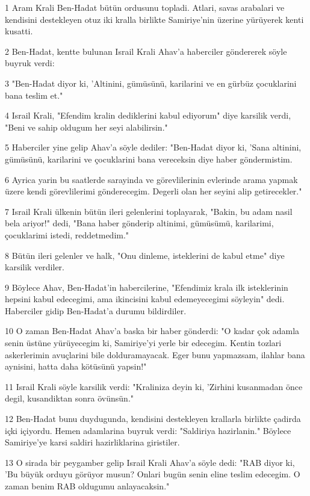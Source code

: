 \par 1 Aram Krali Ben-Hadat bütün ordusunu topladi. Atlari, savas arabalari ve kendisini destekleyen otuz iki kralla birlikte Samiriye'nin üzerine yürüyerek kenti kusatti.
\par 2 Ben-Hadat, kentte bulunan Israil Krali Ahav'a haberciler göndererek söyle buyruk verdi:
\par 3 "Ben-Hadat diyor ki, 'Altinini, gümüsünü, karilarini ve en gürbüz çocuklarini bana teslim et."
\par 4 Israil Krali, "Efendim kralin dediklerini kabul ediyorum" diye karsilik verdi, "Beni ve sahip oldugum her seyi alabilirsin."
\par 5 Haberciler yine gelip Ahav'a söyle dediler: "Ben-Hadat diyor ki, 'Sana altinini, gümüsünü, karilarini ve çocuklarini bana vereceksin diye haber göndermistim.
\par 6 Ayrica yarin bu saatlerde sarayinda ve görevlilerinin evlerinde arama yapmak üzere kendi görevlilerimi gönderecegim. Degerli olan her seyini alip getirecekler."
\par 7 Israil Krali ülkenin bütün ileri gelenlerini toplayarak, "Bakin, bu adam nasil bela ariyor!" dedi, "Bana haber gönderip altinimi, gümüsümü, karilarimi, çocuklarimi istedi, reddetmedim."
\par 8 Bütün ileri gelenler ve halk, "Onu dinleme, isteklerini de kabul etme" diye karsilik verdiler.
\par 9 Böylece Ahav, Ben-Hadat'in habercilerine, "Efendimiz krala ilk isteklerinin hepsini kabul edecegimi, ama ikincisini kabul edemeyecegimi söyleyin" dedi. Haberciler gidip Ben-Hadat'a durumu bildirdiler.
\par 10 O zaman Ben-Hadat Ahav'a baska bir haber gönderdi: "O kadar çok adamla senin üstüne yürüyecegim ki, Samiriye'yi yerle bir edecegim. Kentin tozlari askerlerimin avuçlarini bile dolduramayacak. Eger bunu yapmazsam, ilahlar bana aynisini, hatta daha kötüsünü yapsin!"
\par 11 Israil Krali söyle karsilik verdi: "Kraliniza deyin ki, 'Zirhini kusanmadan önce degil, kusandiktan sonra övünsün."
\par 12 Ben-Hadat bunu duydugunda, kendisini destekleyen krallarla birlikte çadirda içki içiyordu. Hemen adamlarina buyruk verdi: "Saldiriya hazirlanin." Böylece Samiriye'ye karsi saldiri hazirliklarina giristiler.
\par 13 O sirada bir peygamber gelip Israil Krali Ahav'a söyle dedi: "RAB diyor ki, 'Bu büyük orduyu görüyor musun? Onlari bugün senin eline teslim edecegim. O zaman benim RAB oldugumu anlayacaksin."
